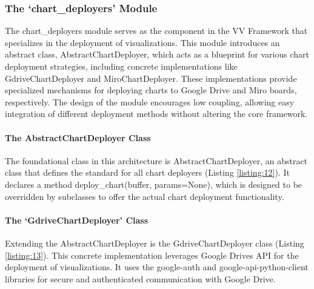 \subsubsection{The `chart\_deployers'
Module}\label{the-chart_deployers-module}

The chart\_deployers module serves as the component in the VV Framework
that specializes in the deployment of visualizations. This module
introduces an abstract class, AbstractChartDeployer, which acts as a
blueprint for various chart deployment strategies, including concrete
implementations like GdriveChartDeployer and MiroChartDeployer. These
implementations provide specialized mechanisms for deploying charts to
Google Drive and Miro boards, respectively. The design of the module
encourages low coupling, allowing easy integration of different
deployment methods without altering the core framework.

\paragraph{The AbstractChartDeployer
Class}\label{the-abstractchartdeployer-class}

The foundational class in this architecture is AbstractChartDeployer, an
abstract class that defines the standard for all chart deployers
(Listing \ref{listing:12}). It declares a method deploy\_chart(buffer, params=None),
which is designed to be overridden by subclasses to offer the actual
chart deployment functionality.


\paragraph{The `GdriveChartDeployer'
Class}\label{the-gdrivechartdeployer-class}

Extending the AbstractChartDeployer is the GdriveChartDeployer class
(Listing \ref{listing:13}). This concrete implementation leverages Google
Drive\textquotesingle s API for the deployment of visualizations. It
uses the google-auth and google-api-python-client libraries for secure
and authenticated communication with Google Drive.

